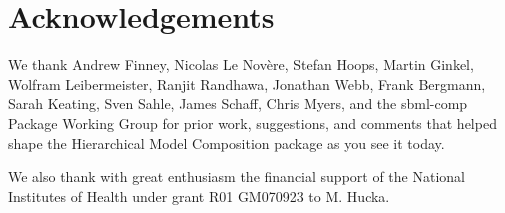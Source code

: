 
\section{Acknowledgements}

We thank Andrew Finney, Nicolas Le Nov\`{e}re, Stefan Hoops, Martin Ginkel,
Wolfram Leibermeister, Ranjit Randhawa, Jonathan Webb, Frank Bergmann,
Sarah Keating, Sven Sahle, James Schaff, Chris Myers, and the sbml-comp
Package Working Group for prior work, suggestions, and comments that helped
shape the Hierarchical Model Composition package as you see it today.

We also thank with great enthusiasm the financial support of the National
Institutes of Health under grant R01 GM070923 to M. Hucka.
